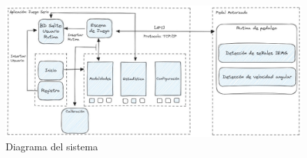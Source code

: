 \begin{figure}[ht]
    \centering
    \includegraphics[scale=0.38]{images/system.jpg}
    \caption{Diagrama del sistema}
    \label{fig: system}
\end{figure}
